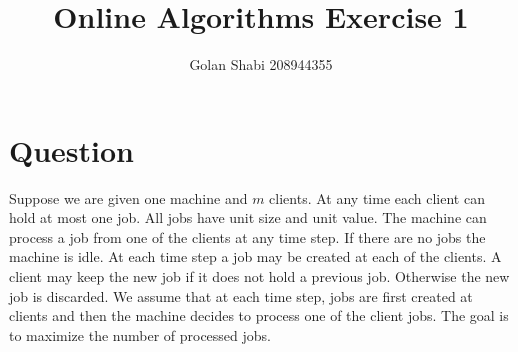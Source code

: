 \documentclass{article}
\title{Online Algorithms Exercise 1}
\author{Golan Shabi 208944355}
\begin{document}
\maketitle
\section*{Question}
Suppose we are given one machine and $m$ clients. At any time each client can hold at most one job. All jobs have unit size and unit value. The machine can process a job from one of the clients at any time step. If there are no jobs the machine is idle. At each time step a job may be created at each of the clients. A client may keep the new job if it does not hold a previous job. Otherwise the new job is discarded. We assume that at each time step, jobs are first created at clients and then the machine decides to process one of the client jobs. The goal is to maximize the number of processed jobs.

\pagebreak


\pagebreak


\pagebreak
\end{document}
